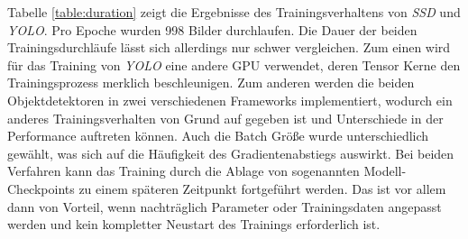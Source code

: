Tabelle \ref{table:duration} zeigt die Ergebnisse des Trainingsverhaltens von \textit{SSD} und \textit{YOLO}. Pro Epoche wurden 998 Bilder durchlaufen. Die Dauer der beiden Trainingsdurchläufe lässt sich allerdings nur schwer vergleichen. Zum einen wird für das Training von \textit{YOLO} eine andere GPU verwendet, deren Tensor Kerne den Trainingsprozess merklich beschleunigen. Zum anderen werden die beiden Objektdetektoren in zwei verschiedenen Frameworks implementiert, wodurch ein anderes Trainingsverhalten von Grund auf gegeben ist und Unterschiede in der Performance auftreten können. Auch die Batch Größe wurde unterschiedlich gewählt, was sich auf die Häufigkeit des Gradientenabstiegs auswirkt. Bei beiden Verfahren kann das Training durch die Ablage von sogenannten Modell-Checkpoints zu einem späteren Zeitpunkt fortgeführt werden. Das ist vor allem dann von Vorteil, wenn nachträglich Parameter oder Trainingsdaten angepasst werden und kein kompletter Neustart des Trainings erforderlich ist.
